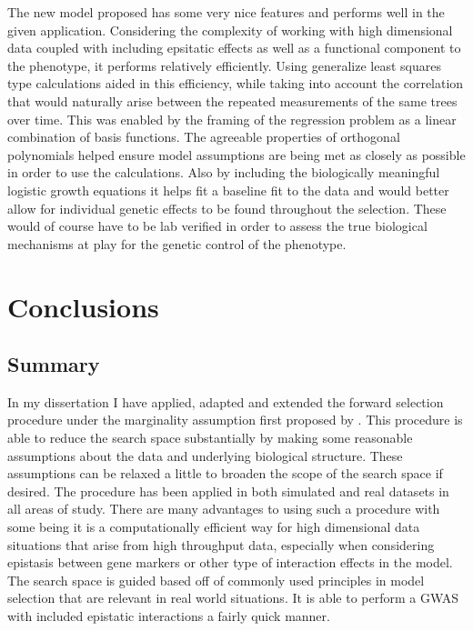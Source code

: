 \documentclass[11pt,]{book}
\theoremstyle{definition}
\theoremstyle{definition}
\theoremstyle{remark}
\begin{document}
The new model proposed has some very nice features and performs well in
the given application. Considering the complexity of working with high
dimensional data coupled with including epsitatic effects as well as a
functional component to the phenotype, it performs relatively
efficiently. Using generalize least squares type calculations aided in
this efficiency, while taking into account the correlation that would
naturally arise between the repeated measurements of the same trees over
time. This was enabled by the framing of the regression problem as a
linear combination of basis functions. The agreeable properties of
orthogonal polynomials helped ensure model assumptions are being met as
closely as possible in order to use the calculations. Also by including
the biologically meaningful logistic growth equations it helps fit a
baseline fit to the data and would better allow for individual genetic
effects to be found throughout the selection. These would of course have
to be lab verified in order to assess the true biological mechanisms at
play for the genetic control of the phenotype.

\chapter{Conclusions}\label{conclusions-1}

\section{Summary}\label{summary}

In my dissertation I have applied, adapted and extended the forward
selection procedure under the marginality assumption first proposed by
\cite{hao2014interaction}. This procedure is able to reduce the search
space substantially by making some reasonable assumptions about the data
and underlying biological structure. These assumptions can be relaxed a
little to broaden the scope of the search space if desired. The
procedure has been applied in both simulated and real datasets in all
areas of study. There are many advantages to using such a procedure with
some being it is a computationally efficient way for high dimensional
data situations that arise from high throughput data, especially when
considering epistasis between gene markers or other type of interaction
effects in the model. The search space is guided based off of commonly
used principles in model selection that are relevant in real world
situations. It is able to perform a GWAS with included epistatic
interactions a fairly quick manner.
\end{document}
